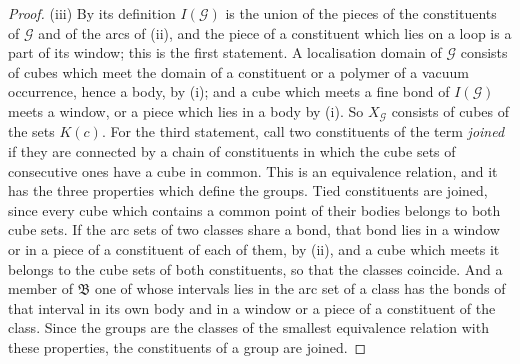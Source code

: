 \documentclass[11pt]{preprint}
\numberwithin{equation}{section}
\theoremstyle{definition}
\theoremstyle{remark}
\theoremstyle{plain}
\begin{document}
\begin{proof}
(iii) By its definition $I(\mathcal G)$ is the union of the pieces of the constituents of $\mathcal G$ and of the arcs of (ii), and the piece of a constituent which lies on a loop is a part of its window; this is the first statement. A localisation domain of $\mathcal G$ consists of cubes which meet the domain of a constituent or a polymer of a vacuum occurrence, hence a body, by (i); and a cube which meets a fine bond of $I(\mathcal G)$ meets a window, or a piece which lies in a body by (i). So $X_{\mathcal G}$ consists of cubes of the sets $K(c)$. For the third statement, call two constituents of the term \emph{joined} if they are connected by a chain of constituents in which the cube sets of consecutive ones have a cube in common. This is an equivalence relation, and it has the three properties which define the groups. Tied constituents are joined, since every cube which contains a common point of their bodies belongs to both cube sets. If the arc sets of two classes share a bond, that bond lies in a window or in a piece of a constituent of each of them, by (ii), and a cube which meets it belongs to the cube sets of both constituents, so that the classes coincide. And a member of $\mathfrak B$ one of whose intervals lies in the arc set of a class has the bonds of that interval in its own body and in a window or a piece of a constituent of the class. Since the groups are the classes of the smallest equivalence relation with these properties, the constituents of a group are joined.


\end{proof}
\end{document}
